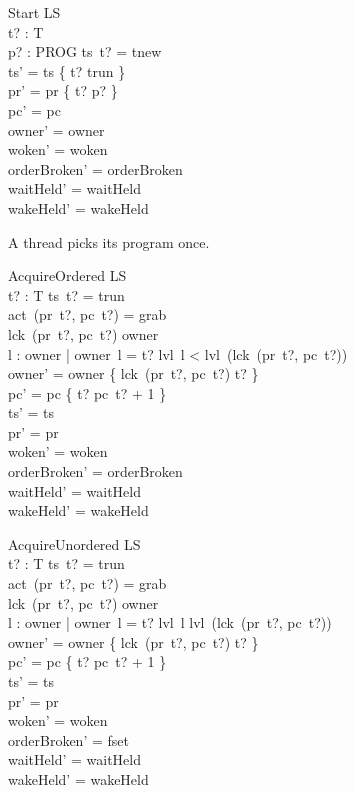 \documentclass[a4paper,10pt,fleqn]{article}
\begin{document}
\begin{schema}{Start}
  \Delta LS \\
  t? : T \\
  p? : PROG
\where
  ts~t? = tnew \\
  ts' = ts \oplus \{ t? \mapsto trun \} \\
  pr' = pr \oplus \{ t? \mapsto p? \} \\
  pc' = pc \\
  owner' = owner \\
  woken' = woken \\
  orderBroken' = orderBroken \\
  waitHeld' = waitHeld \\
  wakeHeld' = wakeHeld
\end{schema}

A thread picks its program once.

\begin{schema}{AcquireOrdered}
  \Delta LS \\
  t? : T
\where
  ts~t? = trun \\
  act~(pr~t?, pc~t?) = grab \\
  lck~(pr~t?, pc~t?) \notin \dom owner \\
  \forall l : \dom owner | owner~l = t? \spot
    lvl~l < lvl~(lck~(pr~t?, pc~t?)) \\
  owner' = owner \cup \{ lck~(pr~t?, pc~t?) \mapsto t? \} \\
  pc' = pc \oplus \{ t? \mapsto pc~t? + 1 \} \\
  ts' = ts \\
  pr' = pr \\
  woken' = woken \\
  orderBroken' = orderBroken \\
  waitHeld' = waitHeld \\
  wakeHeld' = wakeHeld
\end{schema}

\begin{schema}{AcquireUnordered}
  \Delta LS \\
  t? : T
\where
  ts~t? = trun \\
  act~(pr~t?, pc~t?) = grab \\
  lck~(pr~t?, pc~t?) \notin \dom owner \\
  \exists l : \dom owner | owner~l = t? \spot
    lvl~l \geq lvl~(lck~(pr~t?, pc~t?)) \\
  owner' = owner \cup \{ lck~(pr~t?, pc~t?) \mapsto t? \} \\
  pc' = pc \oplus \{ t? \mapsto pc~t? + 1 \} \\
  ts' = ts \\
  pr' = pr \\
  woken' = woken \\
  orderBroken' = fset \\
  waitHeld' = waitHeld \\
  wakeHeld' = wakeHeld
\end{schema}
\end{document}
